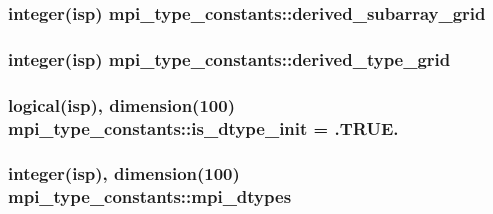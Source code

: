 \subsubsection[{\texorpdfstring{derived\+\_\+subarray\+\_\+grid}{derived_subarray_grid}}]{\setlength{\rightskip}{0pt plus 5cm}integer(isp) mpi\+\_\+type\+\_\+constants\+::derived\+\_\+subarray\+\_\+grid}\hypertarget{namespacempi__type__constants_ad3a88774f5b3d027503997955c593325}{}\label{namespacempi__type__constants_ad3a88774f5b3d027503997955c593325}
\subsubsection[{\texorpdfstring{derived\+\_\+type\+\_\+grid}{derived_type_grid}}]{\setlength{\rightskip}{0pt plus 5cm}integer(isp) mpi\+\_\+type\+\_\+constants\+::derived\+\_\+type\+\_\+grid}\hypertarget{namespacempi__type__constants_a4463600d2b1297b8b25562589ae2ed28}{}\label{namespacempi__type__constants_a4463600d2b1297b8b25562589ae2ed28}
\subsubsection[{\texorpdfstring{is\+\_\+dtype\+\_\+init}{is_dtype_init}}]{\setlength{\rightskip}{0pt plus 5cm}logical(isp), dimension(100) mpi\+\_\+type\+\_\+constants\+::is\+\_\+dtype\+\_\+init = .T\+R\+U\+E.}\hypertarget{namespacempi__type__constants_ad8671c5eb1d13c7171bfb4617dab9a38}{}\label{namespacempi__type__constants_ad8671c5eb1d13c7171bfb4617dab9a38}
\subsubsection[{\texorpdfstring{mpi\+\_\+dtypes}{mpi_dtypes}}]{\setlength{\rightskip}{0pt plus 5cm}integer(isp), dimension(100) mpi\+\_\+type\+\_\+constants\+::mpi\+\_\+dtypes}\hypertarget{namespacempi__type__constants_a17a815d34db410fbd4e9591e3a0fdd96}{}\label{namespacempi__type__constants_a17a815d34db410fbd4e9591e3a0fdd96}
